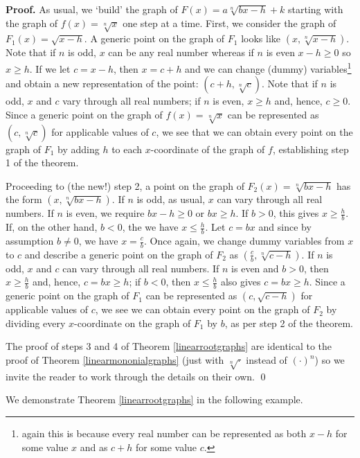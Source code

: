 \documentclass{ximera}
\begin{document}

 {\bf Proof.}  As usual, we `build' the graph of $F(x) = a \sqrt[n]{bx-h}+k$ starting with the graph of $f(x) = \sqrt[n]{x}$ one step at a time.  First, we consider the graph of $F_{1}(x) = \sqrt{x-h}$.  A generic point on the graph of $F_{1}$ looks like $(x, \sqrt[n]{x-h})$.  Note that if $n$ is odd, $x$ can be any real number whereas if $n$ is even $x-h \geq 0$ so $x \geq h$.   If we let $c = x-h$, then $x = c+h$ and we can change (dummy) variables\footnote{again this is because every real number can be represented as both $x-h$ for some value $x$ and as $c+h$  for some value $c$.} and obtain a new representation of the point: $(c+h, \sqrt[n]{c})$.  Note that if $n$ is odd, $x$ and $c$ vary through all real numbers;  if $n$ is even, $x \geq h$ and, hence,  $c \geq 0$.  Since a generic point on the graph of $f(x) = \sqrt[n]{x}$ can be represented as $(c, \sqrt[n]{c})$ for applicable values of $c$, we see that we can obtain every point on the graph of $F_{1}$ by adding $h$ to each $x$-coordinate of the graph of $f$, establishing step 1 of the theorem.  
 
Proceeding to (the new!) step 2, a point on the graph of $F_{2}(x) = \sqrt[n]{bx-h}$ has the form $(x, \sqrt[n]{bx-h})$.  If $n$ is odd, as usual, $x$ can vary through all real numbers.  If $n$ is even, we require $bx-h \geq 0$ or $bx \geq h$.  If $b>0$, this gives $x \geq \frac{h}{b}$.  If, on the other hand, $b<0$, the we have $x \leq \frac{h}{b}$.   Let  $c = bx$ and since by assumption $b \neq 0$, we have $x = \frac{c}{b}$. Once again, we change dummy variables from $x$ to $c$ and describe a generic point on the graph of $F_{2}$ as $\left( \frac{c}{b}, \sqrt[n]{c - h} \right)$.  If $n$ is odd, $x$ and $c$ can vary through all real numbers.  If $n$ is even and $b>0$, then $x \geq \frac{h}{b}$ and, hence, $c = bx \geq h$;  if $b<0$, then $x \leq \frac{h}{b}$ also gives $c = bx \geq h$.  Since a generic point on the graph of $F_{1}$ can be represented as $(c, \sqrt{c-h})$ for applicable values of $c$, we see we can obtain every point on the graph of $F_{2}$ by dividing every $x$-coordinate on the graph of $F_{1}$ by $b$, as per step 2 of the theorem.

The proof of steps 3 and 4 of Theorem \ref{linearrootgraphs} are identical to the proof of  Theorem \ref{linearmononialgraphs} (just with $\sqrt[n]{\cdot}$ instead of $( \cdot )^n$) so we invite the reader to work through the details on their own.  \qed

We  demonstrate Theorem \ref{linearrootgraphs} in the following example.
\end{document}
